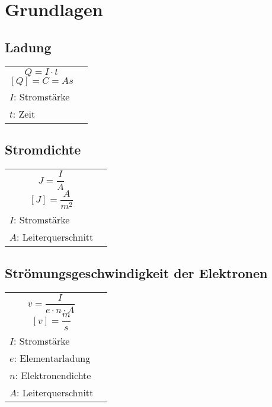 
\section{Grundlagen}
\label{sec:Grundglagen}
\subsection{Ladung}
\label{sec:Ladung}

\begin{tabular}{l l}
	\begin{minipage}[l]{5cm}
		\[
			Q=I \cdot t
		\]	
		\[
			[Q]=C=As
		\]
	\end{minipage}
	&
	\begin{minipage}[l]{5cm}
		$Q$: Ladung \\
		$I$: Stromstärke \\
		$t$: Zeit
	\end{minipage}
\end{tabular}

\subsection{Stromdichte}
\label{sec:Stromdichte}

\begin{tabular}{l l}
	\begin{minipage}[l]{5cm}
		\[
			J=\frac{I}{A}
		\]
		\[
			[J] = \frac{A}{m^2}
		\]
	\end{minipage}
	&
	\begin{minipage}[l]{5cm}
		$J$: Stromdichte \\
		$I$: Stromstärke \\
		$A$: Leiterquerschnitt
	\end{minipage}
\end{tabular}	


\subsection{Strömungsgeschwindigkeit der Elektronen}
\label{sec:StrömungsgeschwindigkeitDerElektronen}

\begin{tabular}{l l}
		\begin{minipage}[l]{5cm}
		\[
		v=\frac{I}{e\cdot n\cdot A}
		\]
		\[
		[v]=\frac{m}{s}
		\]
		\end{minipage}
	&
	
	\begin{minipage}[l]{5cm}
		$v$: Stömungsgeschwindigkeit \\ 
		$I$: Stromstärke \\
		$e$: Elementarladung \\
		$n$: Elektronendichte \\
		$A$: Leiterquerschnitt
	\end{minipage}
\end{tabular}

